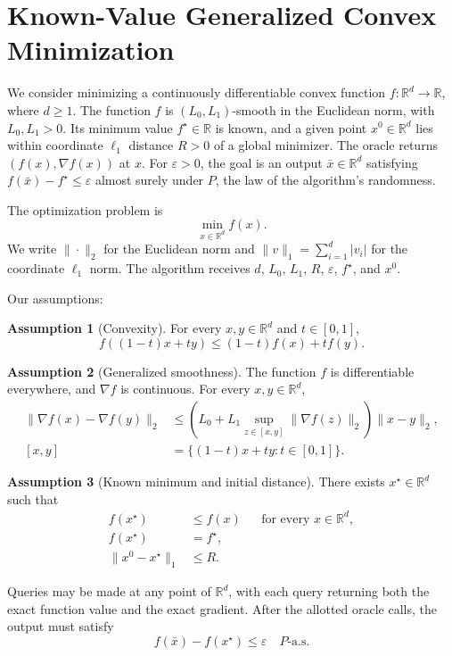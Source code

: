 \documentclass[10pt]{article}
\theoremstyle{definition}
\newtheorem{assumption}{Assumption}
\begin{document}
\section*{Known-Value Generalized Convex Minimization}
We consider minimizing a continuously differentiable convex function $f:\mathbb{R}^d\to\mathbb{R}$, where $d\geq 1$. The function $f$ is $(L_0,L_1)$-smooth in the Euclidean norm, with $L_0,L_1>0$. Its minimum value $f^\star\in\mathbb{R}$ is known, and a given point $x^0\in\mathbb{R}^d$ lies within coordinate $\ell_1$ distance $R>0$ of a global minimizer. The oracle returns $(f(x),\nabla f(x))$ at $x$. For $\varepsilon>0$, the goal is an output $\bar{x}\in\mathbb{R}^d$ satisfying $f(\bar{x})-f^\star\leq\varepsilon$ almost surely under $P$, the law of the algorithm's randomness.

The optimization problem is
\[
\min_{x\in\mathbb{R}^d} f(x).
\]
We write $\|\cdot\|_2$ for the Euclidean norm and $\|v\|_1=\sum_{i=1}^d |v_i|$ for the coordinate $\ell_1$ norm. The algorithm receives $d$, $L_0$, $L_1$, $R$, $\varepsilon$, $f^\star$, and $x^0$.

Our assumptions:
\begin{assumption}[Convexity]
For every $x,y\in\mathbb{R}^d$ and $t\in[0,1]$,
\[
f((1-t)x+ty)\leq (1-t)f(x)+t f(y).
\]
\end{assumption}

\begin{assumption}[Generalized smoothness]
The function $f$ is differentiable everywhere, and $\nabla f$ is continuous. For every $x,y\in\mathbb{R}^d$,
\[
\begin{aligned}
\|\nabla f(x)-\nabla f(y)\|_2
&\leq \left(L_0+L_1\sup_{z\in[x,y]}\|\nabla f(z)\|_2\right)
\|x-y\|_2,\\
[x,y]&=\{(1-t)x+ty:t\in[0,1]\}.
\end{aligned}
\]
\end{assumption}

\begin{assumption}[Known minimum and initial distance]
There exists $x^\star\in\mathbb{R}^d$ such that
\[
\begin{aligned}
f(x^\star)&\leq f(x) &&\text{for every }x\in\mathbb{R}^d,\\
f(x^\star)&=f^\star,\\
\|x^0-x^\star\|_1&\leq R.
\end{aligned}
\]
\end{assumption}

Queries may be made at any point of $\mathbb{R}^d$, with each query returning both the exact function value and the exact gradient. After the allotted oracle calls, the output must satisfy
\[
f(\bar{x})-f(x^\star)\leq\varepsilon
\quad P\text{-a.s.}
\]
\end{document}
